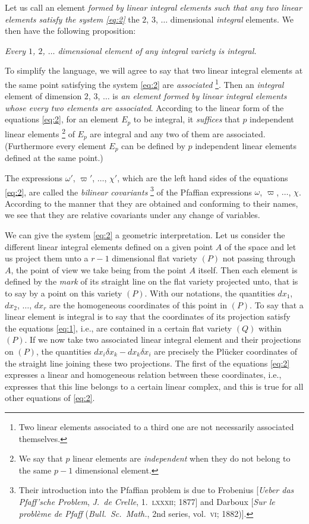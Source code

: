 \documentclass[leqno,11pt]{book}
\theoremstyle{shape1}
\theoremstyle{shapesmall}
\newcommand{\vp}{\varpi}
\newcommand{\somespace}{\vspace{9pt}}
\begin{document}
Let us call an element \emph{formed by linear integral elements such that any two linear elements satisfy the system \eqref{eq:2}} the $2$, $3$, $\dots$ dimensional \emph{integral} elements. We then have the following proposition:

\somespace

\emph{Every $1$, $2$, $\dots$ dimensional element of any integral variety is integral.}

\somespace

To simplify the language, we will agree to say that two linear integral elements at the same point satisfying the system \eqref{eq:2} are \emph{associated} \footnote{Two linear elements associated to a third one are not necessarily associated themselves.}. Then an \emph{integral} element of dimension $2$, $3$, $\dots$ is \emph{an element formed by linear integral elements whose every two elements are associated}. According to the linear form of the equations \eqref{eq:2}, for an element $E_{p}$ to be integral, it \emph{suffices} that $p$ independent linear elements \footnote{We say that $p$ linear elements are \emph{independent} when they do not belong to the same $p-1$ dimensional element.} of $E_{p}$ are integral and any two of them are associated. (Furthermore every element $E_{p}$ can be defined by $p$ independent linear elements defined at the same point.)

The expressions $\omega'$, $\vp'$, $\dots$, $\chi'$, which are the left hand sides of the equations \eqref{eq:2}, are called the \emph{bilinear covariants} \footnote{Their introduction into the Pfaffian problem is due to Frobenius [\emph{Ueber das Pfaff'sche Problem}, \emph{J.~de Crelle}, 1.~\textsc{lxxxii}; 1877] and Darboux [\emph{Sur le problème de Pfaff} (\emph{Bull.~Sc.~Math.}, 2nd series, vol.~\textsc{vi}; 1882)].} of the Pfaffian expressions $\omega$, $\vp$, $\dots$, $\chi$. According to the manner that they are obtained and conforming to their names, we see that they are relative covariants under any change of variables.

We can give the system \eqref{eq:2} a geometric interpretation. Let us consider the different linear integral elements defined on a given point $A$ of the space and let us project them unto a $r-1$ dimensional flat variety $(P)$ not passing through $A$, the point of view we take being from the point $A$ itself. Then each element is defined by the \emph{mark} of its straight line on the flat variety projected unto, that is to say by a point on this variety $(P)$. With our notations, the quantities $dx_{1}$, $dx_{2}$, $\dots$, $dx_{r}$ are the homogeneous coordinates of this point in $(P)$. To say that a linear element is integral is to say that the coordinates of its projection satisfy the equations \eqref{eq:1}, i.e., are contained in a certain flat variety $(Q)$ within $(P)$. If we now take two associated linear integral element and their projections on $(P)$, the quantities $dx_{i}\delta x_{k}-dx_{k}\delta x_{i}$ are precisely the Plücker coordinates of the straight line joining these two projections. The first of the equations \eqref{eq:2} expresses a linear and homogeneous relation between these coordinates, i.e., expresses that this line belongs to a certain linear complex, and this is true for all other equations of \eqref{eq:2}.
\end{document}
